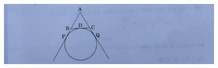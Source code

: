 \documentclass[12pt,-letter paper]{article}
\begin{document}
\begin{enumerate}
	\begin{figure}[H]
        \centering
        \includegraphics[width=\columnwidth]{Figs/file4.jpg}
        \caption{}                                                                                                                            \label{fig:figure4}
        \end{figure}

\end{enumerate}
\end{document}
